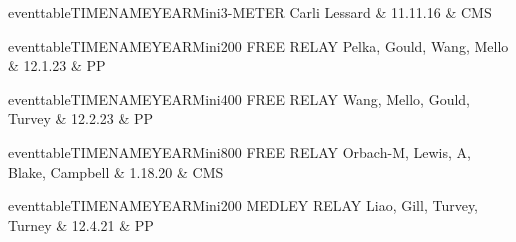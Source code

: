 \begin{minipage}[t]{0.44\textwidth}
\centering
eventtableTIMENAMEYEARMini{3-METER}{
Carli Lessard & 11.11.16 & CMS \\
}
\end{minipage}\hfill
\begin{minipage}[t]{0.44\textwidth}
\centering

\end{minipage}

\vspace{0.3cm}

\begin{minipage}[t]{0.44\textwidth}
\centering
eventtableTIMENAMEYEARMini{200 FREE RELAY}{
Pelka, Gould, Wang, Mello & 12.1.23 & PP \\
}
\end{minipage}\hfill
\begin{minipage}[t]{0.44\textwidth}
\centering

\end{minipage}

\vspace{0.3cm}

\begin{minipage}[t]{0.44\textwidth}
\centering
eventtableTIMENAMEYEARMini{400 FREE RELAY}{
Wang, Mello, Gould, Turvey & 12.2.23 & PP \\
}
\end{minipage}\hfill
\begin{minipage}[t]{0.44\textwidth}
\centering

\end{minipage}

\vspace{0.3cm}

\begin{minipage}[t]{0.44\textwidth}
\centering
eventtableTIMENAMEYEARMini{800 FREE RELAY}{
Orbach-M, Lewis, A, Blake, Campbell & 1.18.20 & CMS \\
}
\end{minipage}\hfill
\begin{minipage}[t]{0.44\textwidth}
\centering

\end{minipage}

\vspace{0.3cm}

\begin{minipage}[t]{0.44\textwidth}
\centering
eventtableTIMENAMEYEARMini{200 MEDLEY RELAY}{
Liao, Gill, Turvey, Turney & 12.4.21 & PP \\
}
\end{minipage}\hfill
\begin{minipage}[t]{0.44\textwidth}
\centering

\end{minipage}


